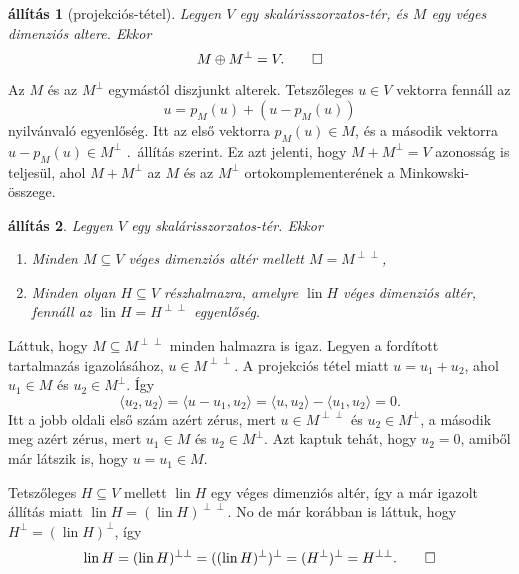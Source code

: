 \documentclass[9pt, a4paper, showtrims]{memoir}
\makeatletter
\renewenvironment{proof}[1][\proofname]
    {\par\pushQED{\qed}%
    \normalfont \topsep6\p@\@plus6\p@\relax
    \trivlist
    \item[\hskip\labelsep
        \itshape
    #1\@addpunct{:}]\ignorespaces}
    {\popQED\endtrivlist\@endpefalse}
\theoremstyle{plain}
\newtheorem{proposition}{állítás}[chapter]
\theoremstyle{remark}
\theoremstyle{definition}
\DeclareMathOperator{\lin}{lin}
\newcommand{\ip}[2]{\langle#1,#2\rangle}
\makeatother
\begin{document}
\begin{proposition}[projekciós-tétel]\label{pr:projekcios}
    Legyen $V$ egy skalárisszorzatos-tér, és $M$ egy véges dimenziós altere.
    Ekkor 
    \[
        M\oplus M^\perp=V.
        \qedhere
    \]
\end{proposition}
\begin{proof}
    Az $M$ és az $M^\perp$ egymástól diszjunkt alterek.
    Tetszőleges $u\in V$ vektorra fennáll az 
    \[
        u=p_M\left( u \right)+\left( u-p_M\left( u \right) \right)
    \]
    nyilvánvaló egyenlőség.
    Itt az első vektorra $p_M\left( u \right)\in M$, és a második vektorra $u-p_M\left( u \right)\in M^\perp$
    .~állítás szerint. 
    Ez azt jelenti, hogy $M+M^\perp=V$ azonosság is teljesül,
    ahol $M+M^\perp$ az $M$ és az $M^\perp$ ortokomplementerének a Minkowski-összege.
\end{proof}
\begin{proposition}
    Legyen $V$ egy skalárisszorzatos-tér.
    Ekkor
    \begin{enumerate}
        \item Minden $M\subseteq V$ véges dimenziós altér mellett $M=M^{\perp\perp}$,
        \item Minden olyan $H\subseteq V$ részhalmazra, 
            amelyre $\lin H$ véges dimenziós altér, fennáll az $\lin H=H^{\perp\perp}$ egyenlőség.
            \qedhere
    \end{enumerate}
\end{proposition}
\begin{proof}
    Láttuk, hogy $M\subseteq M^{\perp\perp}$ minden halmazra is igaz.
    Legyen a fordított tartalmazás igazolásához,
    $u\in M^{\perp\perp}$.
    A projekciós tétel miatt $u=u_1+u_2$, 
    ahol $u_1\in M$ és $u_2\in M^{\perp}$.
    Így
    \[
        \ip{u_2}{u_2}
        =
        \ip{u-u_1}{u_2}
        =
        \ip{u}{u_2}-\ip{u_1}{u_2}=0.
    \]
    Itt a jobb oldali első szám azért zérus, 
    mert $u\in M^{\perp\perp}$ és $u_2\in M^\perp$, 
    a második meg azért zérus, 
    mert $u_1\in M$ és $u_2\in M^\perp$.
    Azt kaptuk tehát, hogy $u_2=0$, amiből már látszik is, hogy $u=u_1\in M$.

    Tetszőleges $H\subseteq V$ mellett $\lin H$ egy véges dimenziós altér, 
    így a már igazolt állítás miatt
    $\lin H=(\lin H)^{\perp\perp}$. 
    No de már korábban is láttuk, hogy 
    $H^{\perp}=(\lin H)^\perp$, így 
    \[
        \lin H
        =
        (\lin H)^{\perp\perp}
        =
        ((\lin H)^\perp)^\perp=(H^{\perp})^\perp=H^{\perp\perp}.
        \qedhere
    \]
\end{proof}
\end{document}
